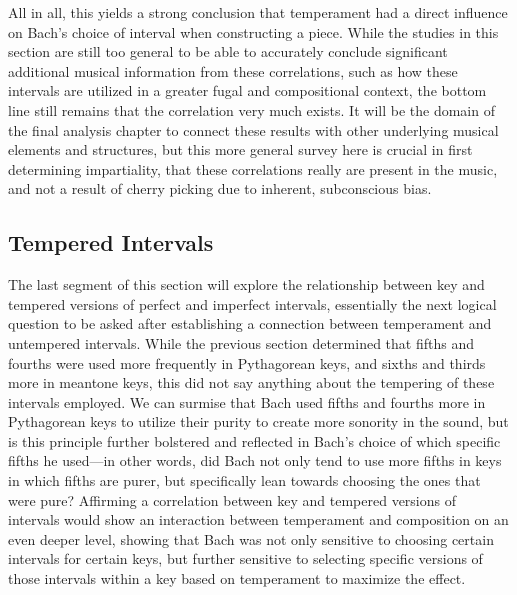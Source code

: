 All in all, this yields a strong conclusion that temperament had a
direct influence on Bach's choice of interval when constructing a piece.
While the studies in this section are still too general to be able to
accurately conclude significant additional musical information from
these correlations, such as how these intervals are utilized in a
greater fugal and compositional context, the bottom line still remains
that the correlation very much exists. It will be the domain of the
final analysis chapter to connect these results with other underlying
musical elements and structures, but this more general survey here is
crucial in first determining impartiality, that these correlations
really are present in the music, and not a result of cherry picking due
to inherent, subconscious bias.

    \subsection{Tempered Intervals}\label{tempered-intervals}

The last segment of this section will explore the relationship between
key and tempered versions of perfect and imperfect intervals,
essentially the next logical question to be asked after establishing a
connection between temperament and untempered intervals. While the
previous section determined that fifths and fourths were used more
frequently in Pythagorean keys, and sixths and thirds more in meantone
keys, this did not say anything about the tempering of these intervals
employed. We can surmise that Bach used fifths and fourths more in
Pythagorean keys to utilize their purity to create more sonority in the
sound, but is this principle further bolstered and reflected in Bach's
choice of which specific fifths he used---in other words, did Bach
not only tend to use more fifths in keys in which fifths are purer, but
specifically lean towards choosing the ones that were pure? Affirming a
correlation between key and tempered versions of intervals would show an
interaction between temperament and composition on an even deeper level,
showing that Bach was not only sensitive to choosing certain intervals
for certain keys, but further sensitive to selecting specific versions
of those intervals within a key based on temperament to maximize the
effect.

